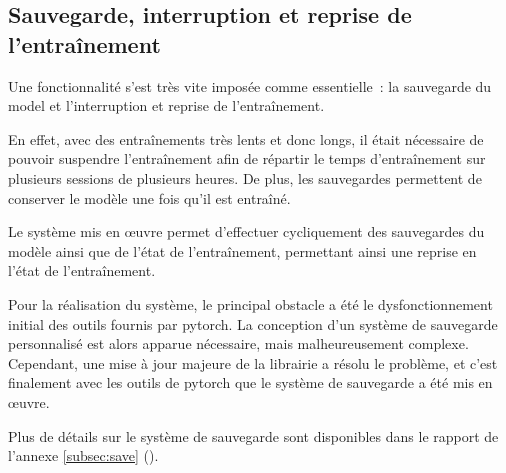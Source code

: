 \subsection{Sauvegarde, interruption et reprise de l'entraînement}\label{subsec:gmsnn_save}
Une fonctionnalité s'est très vite imposée comme essentielle~: la sauvegarde du \gls{model} et l'interruption et reprise de l'entraînement.

En effet, avec des entraînements très lents et donc longs, il était nécessaire de pouvoir suspendre l'entraînement afin de répartir le temps d'entraînement sur plusieurs sessions de plusieurs heures. De plus, les sauvegardes permettent de conserver le modèle une fois qu'il est entraîné.

Le système mis en œuvre permet d'effectuer cycliquement des sauvegardes du modèle ainsi que de l'état de l'entraînement, permettant ainsi une reprise en l'état de l'entraînement.

Pour la réalisation du système, le principal obstacle a été le dysfonctionnement initial des outils fournis par \gls{pytorch}.
La conception d'un système de sauvegarde personnalisé est alors apparue nécessaire, mais malheureusement complexe.
Cependant, une mise à jour majeure de la librairie a résolu le problème, et c'est finalement avec les outils de \gls{pytorch} que le système de sauvegarde a été mis en œuvre.

Plus de détails sur le système de sauvegarde sont disponibles dans le rapport de l'annexe \ref{subsec:save} ().